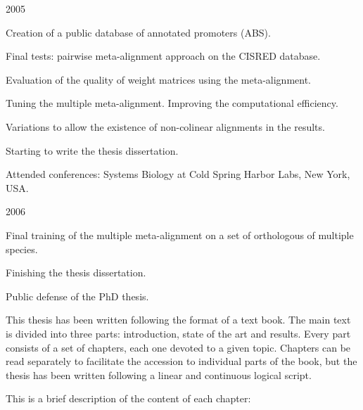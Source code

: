 \begin{mitemize}
\item 2005
\begin{menumerate}
\item
Creation of a public database of annotated promoters (ABS).
\item
Final tests: pairwise meta-alignment approach on the CISRED database.
\item
Evaluation of the quality of weight matrices using the meta-alignment.
\item
Tuning the multiple meta-alignment. Improving the computational efficiency.
\item
Variations to allow the existence of non-colinear alignments in the results.
\item
Starting to write the thesis dissertation.
\item
Attended conferences: Systems Biology at Cold Spring Harbor Labs, New York, USA.
\end{menumerate}

\item 2006
\begin{menumerate}
\item
Final training of the multiple meta-alignment on a set of orthologous of multiple species.
\item
Finishing the thesis dissertation.
\item
Public defense of the PhD thesis.
\end{menumerate}
\end{mitemize}



% 

This thesis has been written following the format of a text book. The main text is divided into
three parts: introduction, state of the art and results. Every part consists of a set of 
chapters, each one devoted to a given topic. Chapters can be read separately to facilitate the accession 
to individual parts of the book, but the thesis has been written following a linear and continuous 
logical script.

\noindent This is a brief description of the content of each chapter:


